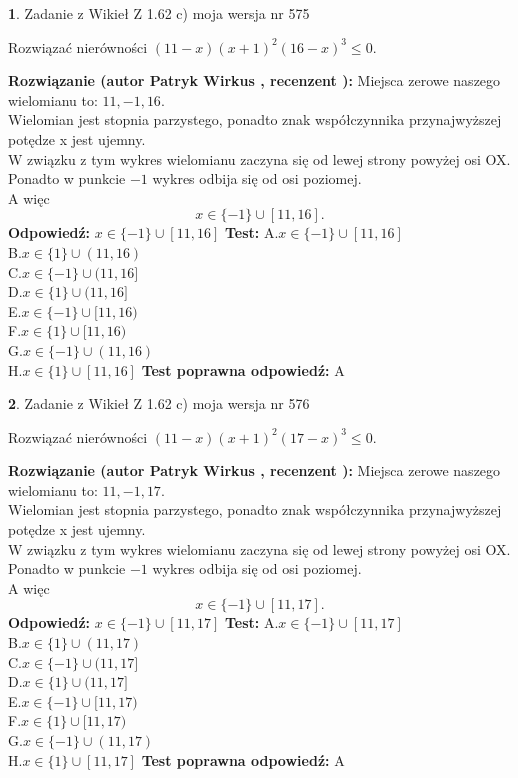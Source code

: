 \documentclass[12pt, a4paper]{article}
\theoremstyle{definition} %
\newtheorem{zad}{}
\newcommand{\zadStart}[1]{\begin{zad}#1\newline}
\newcommand{\zadStop}{\end{zad}}
\newcommand{\rozwStart}[2]{\noindent \textbf{Rozwiązanie (autor #1 , recenzent #2): }\newline}
\newcommand{\rozwStop}{\newline}
\newcommand{\odpStart}{\noindent \textbf{Odpowiedź:}\newline}
\newcommand{\odpStop}{\newline}
\newcommand{\testStart}{\noindent \textbf{Test:}\newline}
\newcommand{\testStop}{\newline}
\newcommand{\kluczStart}{\noindent \textbf{Test poprawna odpowiedź:}\newline}
\newcommand{\kluczStop}{\newline}
\begin{document}
\zadStart{Zadanie z Wikieł Z 1.62 c) moja wersja nr 575}

Rozwiązać nierówności $(11-x)(x+1)^{2}(16-x)^{3}\le0$.
\zadStop
\rozwStart{Patryk Wirkus}{}
Miejsca zerowe naszego wielomianu to: $11, -1, 16$.\\
Wielomian jest stopnia parzystego, ponadto znak współczynnika przy\linebreak najwyższej potędze x jest ujemny.\\ W związku z tym wykres wielomianu zaczyna się od lewej strony powyżej osi OX.\\
Ponadto w punkcie $-1$ wykres odbija się od osi poziomej.\\
A więc $$x \in \{-1\} \cup [11,16].$$
\rozwStop
\odpStart
$x \in \{-1\} \cup [11,16]$
\odpStop
\testStart
A.$x \in \{-1\} \cup [11,16]$\\
B.$x \in \{1\} \cup (11,16)$\\
C.$x \in \{-1\} \cup (11,16]$\\
D.$x \in \{1\} \cup (11,16]$\\
E.$x \in \{-1\} \cup [11,16)$\\
F.$x \in \{1\} \cup [11,16)$\\
G.$x \in \{-1\} \cup (11,16)$\\
H.$x \in \{1\} \cup [11,16]$
\testStop
\kluczStart
A
\kluczStop



\zadStart{Zadanie z Wikieł Z 1.62 c) moja wersja nr 576}

Rozwiązać nierówności $(11-x)(x+1)^{2}(17-x)^{3}\le0$.
\zadStop
\rozwStart{Patryk Wirkus}{}
Miejsca zerowe naszego wielomianu to: $11, -1, 17$.\\
Wielomian jest stopnia parzystego, ponadto znak współczynnika przy\linebreak najwyższej potędze x jest ujemny.\\ W związku z tym wykres wielomianu zaczyna się od lewej strony powyżej osi OX.\\
Ponadto w punkcie $-1$ wykres odbija się od osi poziomej.\\
A więc $$x \in \{-1\} \cup [11,17].$$
\rozwStop
\odpStart
$x \in \{-1\} \cup [11,17]$
\odpStop
\testStart
A.$x \in \{-1\} \cup [11,17]$\\
B.$x \in \{1\} \cup (11,17)$\\
C.$x \in \{-1\} \cup (11,17]$\\
D.$x \in \{1\} \cup (11,17]$\\
E.$x \in \{-1\} \cup [11,17)$\\
F.$x \in \{1\} \cup [11,17)$\\
G.$x \in \{-1\} \cup (11,17)$\\
H.$x \in \{1\} \cup [11,17]$
\testStop
\kluczStart
A
\kluczStop
\end{document}
